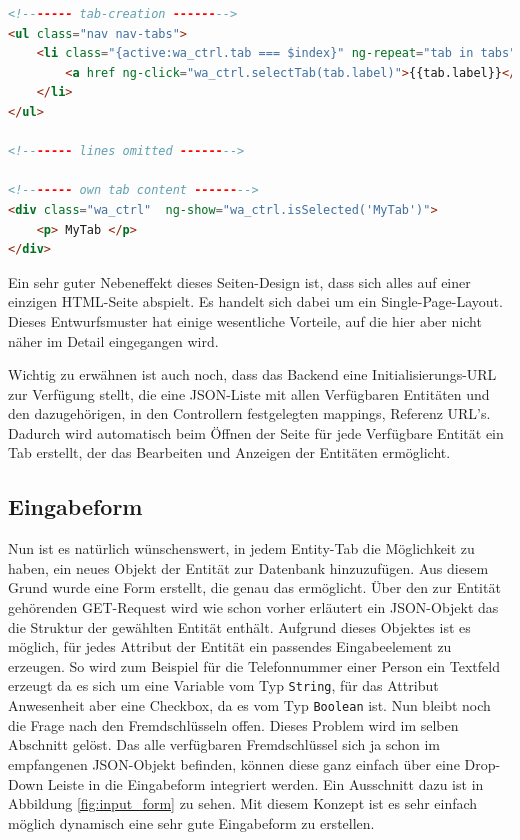 \scriptsize
\begin{lstlisting}[caption=index.html, label=cs:tabs_html, language=HTML]
<!------- tab-creation -------->
<ul class="nav nav-tabs">
	<li class="{active:wa_ctrl.tab === $index}" ng-repeat="tab in tabs">
		<a href ng-click="wa_ctrl.selectTab(tab.label)">{{tab.label}}</a></li>
	</li>
</ul>

<!------- lines omitted -------->

<!------- own tab content -------->
<div class="wa_ctrl"  ng-show="wa_ctrl.isSelected('MyTab')">
	<p> MyTab </p>
</div>
\end{lstlisting}
\normalsize

Ein sehr guter Nebeneffekt dieses Seiten-Design ist, dass sich alles auf einer einzigen HTML-Seite abspielt. Es handelt sich dabei um ein Single-Page-Layout. Dieses Entwurfsmuster hat einige wesentliche Vorteile, auf die hier aber nicht näher im Detail eingegangen wird. 

Wichtig zu erwähnen ist auch noch, dass das Backend eine Initialisierungs-URL zur Verfügung stellt, die eine JSON-Liste mit allen Verfügbaren Entitäten und den dazugehörigen, in den Controllern festgelegten mappings, Referenz URL's. Dadurch wird automatisch beim Öffnen der Seite für jede Verfügbare Entität ein Tab erstellt, der das Bearbeiten und Anzeigen der Entitäten ermöglicht.

\subsection{Eingabeform}

Nun ist es natürlich wünschenswert, in jedem Entity-Tab die Möglichkeit zu haben, ein neues Objekt der Entität zur Datenbank hinzuzufügen. Aus diesem Grund wurde eine Form erstellt, die genau das ermöglicht. Über den zur Entität gehörenden GET-Request wird wie schon vorher erläutert ein JSON-Objekt das die Struktur der gewählten Entität enthält. Aufgrund dieses Objektes ist es möglich, für jedes Attribut der Entität ein passendes Eingabeelement zu erzeugen. So wird zum Beispiel für die Telefonnummer einer Person ein Textfeld erzeugt da es sich um eine Variable vom Typ \verb|String|, für das Attribut Anwesenheit aber eine Checkbox, da es vom Typ \verb|Boolean| ist. Nun bleibt noch die Frage nach den Fremdschlüsseln offen. Dieses Problem wird im selben Abschnitt gelöst. Das alle verfügbaren Fremdschlüssel sich ja schon im empfangenen JSON-Objekt befinden, können diese ganz einfach über eine Drop-Down Leiste in die Eingabeform integriert werden. Ein Ausschnitt dazu ist in Abbildung \ref{fig:input_form} zu sehen. Mit diesem Konzept ist es sehr einfach möglich dynamisch eine sehr gute Eingabeform zu erstellen.

